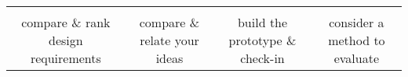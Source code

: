 {\begin{longtable}[]{cccc}
\begin{minipage}[t]{0.21\columnwidth}
\strut
\end{minipage}\tabularnewline
\begin{minipage}[t]{0.21\columnwidth}\raggedright\strut
compare \& rank design requirements\strut
\end{minipage} & \begin{minipage}[t]{0.21\columnwidth}\raggedright\strut
compare \& relate your ideas\strut
\end{minipage} & \begin{minipage}[t]{0.21\columnwidth}\raggedright\strut
build the prototype \& check-in\strut
\end{minipage} & \begin{minipage}[t]{0.21\columnwidth}\raggedright\strut
consider a method to evaluate\strut
\end{minipage}\tabularnewline
\bottomrule
\end{longtable}
\newpage
}
